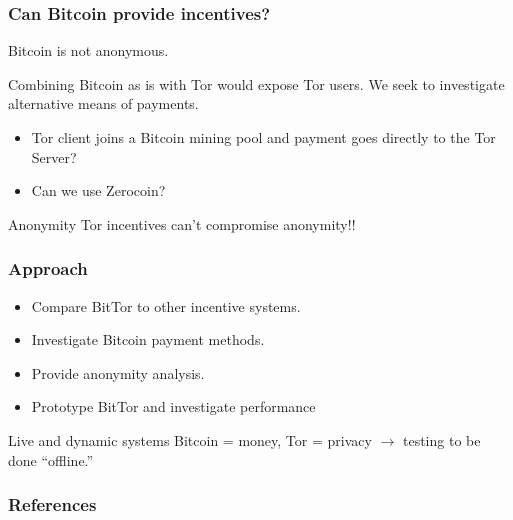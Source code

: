 \documentclass{beamer}
\begin{document}
\begin{frame}
  \frametitle{Can Bitcoin provide incentives?}

  Bitcoin is not
  anonymous.\cite{journals/iacr/AndroulakiKRSC12} \cite{journals/corr/abs-1107-4524}

  Combining Bitcoin as is with Tor would expose Tor users.  We seek to
  investigate alternative means of payments.
  \begin{itemize}
  \item Tor client joins a Bitcoin mining pool and payment goes
    directly to the Tor Server?
  \item Can we use Zerocoin? \cite{Miers:2013:ZAD:2497621.2498124}
    \end{itemize}

  \begin{block}{Anonymity}
    Tor incentives can't compromise anonymity!!
  \end{block}
\end{frame}

\begin{frame}
  \frametitle{Approach}


  \begin{itemize}
  \item Compare BitTor to other incentive
    systems.\cite{Jansen:2010:RNT:1866307.1866344}\cite{lira-ndss13}\cite{raykova-pet2008}
  \item Investigate Bitcoin payment methods.
  \item Provide anonymity analysis.
    \item Prototype BitTor and investigate performance

    \end{itemize}

  \begin{block}{Live and dynamic systems}
    Bitcoin = money, Tor = privacy $\rightarrow$ testing to be done ``offline.''
  \end{block}
\end{frame}



\begin{frame}[allowframebreaks]

  \frametitle{References}
  \begin{small}
  
  
  \end{small}

\end{frame}
\end{document}
